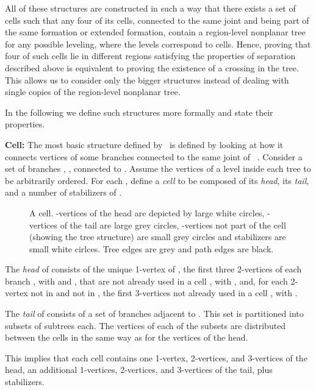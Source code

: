 \documentclass[a4paper,10pt]{llncs}
\newcounter{prop}
\newcommand{\T}{\mbox{ }}
\renewcommand{\P}{\mbox{ }}
\newcommand{\remove}[1]{}
\begin{document}
All of these structures are constructed in such a way that there exists a set of cells such that any four of its cells, connected to the same joint and being part of the same formation or extended formation, contain a region-level nonplanar tree for any possible leveling, where the levels correspond to cells. Hence, proving that four of such cells lie in different regions satisfying the properties of separation described above is equivalent to proving the existence of a crossing in the tree. This allows us to consider only the bigger structures instead of dealing with single copies of the region-level nonplanar tree.

In the following we define such structures more formally and state their properties.

{\bf Cell:}
The most basic structure defined by \P is defined by looking at how it connects vertices of some branches  connected to the same joint  of \T. Consider a set of  branches , , connected to . Assume the vertices of a level inside each tree to be arbitrarily ordered. For each , define a \emph{cell}  to be composed of its \emph{head}, its \emph{tail}, and a number  of
\remove{ } stabilizers of .

\begin{figure}[tb]
\caption{A cell. -vertices of the head are depicted by large white circles,  -vertices of the tail are large grey circles, -vertices not part of the cell (showing the tree structure) are small grey circles and stabilizers are small white cirlces. Tree edges are grey and path edges are black.}\label{fig:cell}
\end{figure}

The {\it head} of  consists of the unique 1-vertex of , the first three 2-vertices of each branch , with  and , that are not already used in a cell , with , and, for each 2-vertex not in  and not in , the first 3-vertices not already used in a cell , with .

The \emph{tail} of  consists of a set of  branches  adjacent to . This set is partitioned into  subsets of  subtrees each. The vertices of each of the subsets are distributed between the cells in the same way as for the vertices of the head.

This implies that each cell contains one 1-vertex,  2-vertices, and  3-vertices of the head, an additional  1-vertices,  2-vertices, and  3-vertices of the tail, plus  stabilizers.
\end{document}
